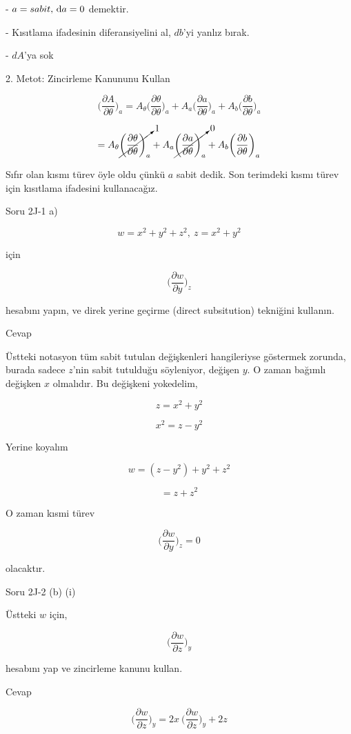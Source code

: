 \documentclass[12pt,fleqn]{article}\usepackage{../../common}
\begin{document}
- $a=sabit, \,\mathrm{d} a=0$ demektir.

- Kısıtlama ifadesinin diferansiyelini al, $db$'yi yanlız bırak. 

- $dA$'ya sok

2. Metot: Zincirleme Kanununu Kullan

$$ \bigg( \frac{\partial A}{\partial \theta} \bigg)_{a} = 
A_\theta \bigg( \frac{\partial \theta}{\partial \theta} \bigg)_{a} + 
A_a \bigg( \frac{\partial a}{\partial \theta} \bigg)_{a} + 
A_b \bigg( \frac{\partial b}{\partial \theta} \bigg)_{a} 
$$

$$  = 
A_\theta \cancelto{1}{\bigg( \frac{\partial \theta}{\partial \theta} \bigg)_{a}} 
+ 
A_a \cancelto{0}{\bigg( \frac{\partial a}{\partial \theta} \bigg)_{a}} + 
A_b \bigg( \frac{\partial b}{\partial \theta} \bigg)_{a}
$$

Sıfır olan kısmı türev öyle oldu çünkü $a$ sabit dedik. Son terimdeki
kısmı türev için kısıtlama ifadesini kullanacağız.

Soru 2J-1 a)

$$ w = x^2+y^2+z^2, \ z = x^2+y^2 $$

için 

$$ \bigg( \frac{\partial w}{\partial y}  \bigg)_z $$

hesabını yapın, ve direk yerine geçirme (direct subsitution) tekniğini
kullanın. 

Cevap 

Üstteki notasyon tüm sabit tutulan değişkenleri hangileriyse göstermek
zorunda, burada sadece $z$'nin sabit tutulduğu söyleniyor, değişen $y$. O
zaman bağımlı değişken $x$ olmalıdır. Bu değişkeni yokedelim,

$$ z = x^2+y^2 $$

$$ x^2 = z - y^2 $$

Yerine koyalım

$$  w = (z-y^2)+y^2+z^2 $$

$$ = z + z^2 $$

O zaman kısmi türev

$$ \bigg( \frac{\partial w}{\partial y}  \bigg)_z  = 0$$

olacaktır. 

Soru 2J-2 (b) (i)

Üstteki $w$ için, 

$$ \bigg( \frac{\partial w}{\partial z}  \bigg)_y $$

hesabını yap ve zincirleme kanunu kullan. 

Cevap 

$$  \bigg( \frac{\partial w}{\partial z}  \bigg)_y  =
2x \  \bigg( \frac{\partial w}{\partial z}  \bigg)_y  +  2z
$$
\end{document}
